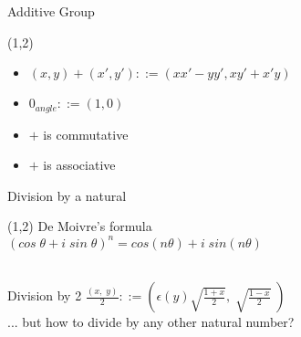 \documentclass{beamer}
\begin{document}
\begin{frame}{Additive Group}
  \begin{textblock}{7}(1,2)
    \begin{itemize}
    \item $(x, y) + (x', y') ::= (x x' - y y', x y' + x' y)$
    \item $0_{angle} ::= (1, 0)$
    \item $+$ is commutative
    \item $+$ is associative
    \end{itemize}
  \end{textblock}
\end{frame}

\begin{frame}{Division by a natural}
  \begin{textblock}{7}(1,2)
    De Moivre's formula \\
    \hspace{5mm} $(cos \; \theta + i \; sin \; \theta)^n = cos (n
    \theta) + i \; sin (n \theta)$ \\
    \ \\
  \end{textblock}
\end{frame}

\begin{frame}{Division by 2}
  $\displaystyle \frac{(x, \; y)}{2} ::=
  \left( \epsilon (y) \sqrt{\frac{1 + x}{2}}, \; \sqrt{\frac{1 -
      x}{2}} \; \right)$
  \\
  \vspace{1cm}
  ... but how to divide by any other natural number?
\end{frame}
\end{document}
